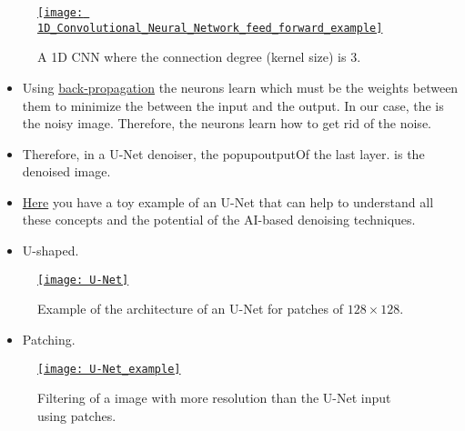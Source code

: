 \begin{figure}[H]
  \vspace{0ex}
  \centering
  \href{https://en.wikipedia.org/wiki/Convolutional_neural_network#/media/File:1D_Convolutional_Neural_Network_feed_forward_example.png}{\texttt{[image: 1D\_Convolutional\_Neural\_Network\_feed\_forward\_example]}}
  \caption{A 1D \gls{CNN} where the connection degree (kernel size) is 3.}
  \label{fig:a_CNN}
\end{figure}

\begin{itemize}
\item Using
  \href{https://en.wikipedia.org/wiki/Backpropagation}{back-propagation}
  the neurons learn which must be the weights between them to
  minimize the  between the input and the output. In our
  case, the  is the noisy image. Therefore, the neurons learn how to
  get rid of the noise.
\item Therefore, in a U-Net denoiser, the popup{output}{Of the last
  layer.}  is the denoised image.
\item
  \href{https://github.com/vicente-gonzalez-ruiz/medical_imaging/blob/main/notebooks/U_Net.ipynb}{Here}
  you have a toy example of an U-Net that can help to understand all
  these concepts and the potential of the \gls{AI}-based denoising
  techniques.
\end{itemize}

\begin{itemize}
\item U-shaped.
\end{itemize}

\begin{figure}[H]
  \vspace{0ex}
  \centering
      \href{https://www.linkedin.com/pulse/14-coding-u-net-architecture-from-scratch-riya-chhikara-xbvte}{\texttt{[image: U-Net]}}
  \caption{Example of the architecture of an U-Net for patches of $128\times 128$.}
  \label{fig:UNet}
\end{figure}

\begin{itemize}
\item Patching.
\end{itemize}

\begin{figure}[H]
  \vspace{0ex}
  \centering
  \href{https://www.linkedin.com/pulse/attention-guided-u-net-model-improved-residual-blocks-gokmen}{\texttt{[image: U-Net\_example]}}
  \caption[Patching with an U-Net.]{Filtering of a image with more resolution than the U-Net input using patches.}
  \label{fig:patching}
\end{figure}
